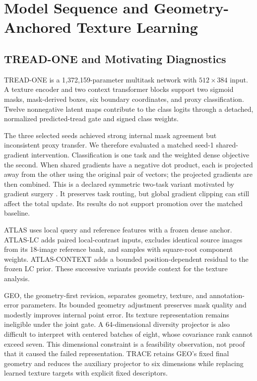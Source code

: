 \section{Model Sequence and Geometry-Anchored Texture Learning}\label{sec:models}
\subsection{TREAD-ONE and Motivating Diagnostics}
TREAD-ONE is a 1,372,159-parameter multitask network with $512\times384$ input. A texture encoder and two context transformer blocks support two sigmoid masks, mask-derived boxes, six boundary coordinates, and proxy classification. Twelve nonnegative latent maps contribute to the class logits through a detached, normalized predicted-tread gate and signed class weights.

The three selected seeds achieved strong internal mask agreement but inconsistent proxy transfer. We therefore evaluated a matched seed-1 shared-gradient intervention. Classification is one task and the weighted dense objective the second. When shared gradients have a negative dot product, each is projected away from the other using the original pair of vectors; the projected gradients are then combined. This is a declared symmetric two-task variant motivated by gradient surgery \cite{pcgrad}. It preserves task routing, but global gradient clipping can still affect the total update. Its results do not support promotion over the matched baseline.

ATLAS uses local query and reference features with a frozen dense anchor. ATLAS-LC adds paired local-contrast inputs, excludes identical source images from its 18-image reference bank, and samples with square-root component weights. ATLAS-CONTEXT adds a bounded position-dependent residual to the frozen LC prior. These successive variants provide context for the texture analysis.

GEO, the geometry-first revision, separates geometry, texture, and annotation-error parameters. Its bounded geometry adjustment preserves mask quality and modestly improves internal point error. Its texture representation remains ineligible under the joint gate. A 64-dimensional diversity projector is also difficult to interpret with centered batches of eight, whose covariance rank cannot exceed seven. This dimensional constraint is a feasibility observation, not proof that it caused the failed representation. TRACE retains GEO's fixed final geometry and reduces the auxiliary projector to six dimensions while replacing learned texture targets with explicit fixed descriptors.

